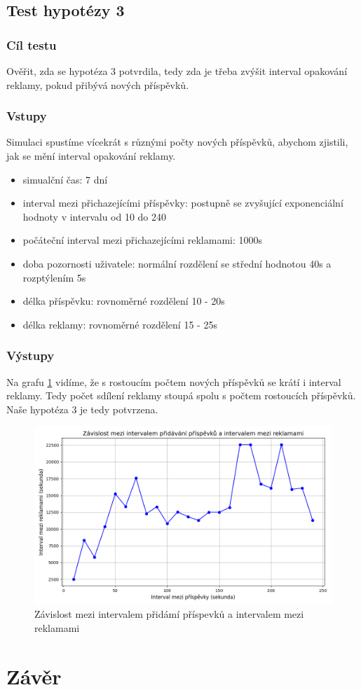 \documentclass[11pt, a4paper]{article}
\begin{document}
\subsection{Test hypotézy 3}
\subsubsection{Cíl testu}
Ověřit, zda se hypotéza 3 potvrdila, tedy zda je třeba zvýšit interval opakování reklamy, pokud přibývá nových příspěvků.
\subsubsection{Vstupy}
Simulaci spustíme vícekrát s různými počty nových příspěvků, abychom zjistili, jak se mění interval opakování reklamy.
\begin{itemize}
    \item simualční čas: 7 dní
    \item interval mezi přichazejícími příspěvky: postupně se zvyšující exponenciální hodnoty v intervalu od 10 do 240
    \item počáteční interval mezi přichazejícími reklamami: 1000s
    \item doba pozornosti uživatele: normální rozdělení se střední hodnotou 40s a rozptýlením 5s
    \item délka příspěvku: rovnoměrné rozdělení 10 - 20s
    \item délka reklamy: rovnoměrné rozdělení 15 - 25s

\end{itemize}
\subsubsection{Výstupy}
Na grafu \ref{fig:post_arrival_time_vs_ad_interval} vidíme, že s rostoucím počtem nových příspěvků se krátí i interval reklamy. Tedy počet sdílení reklamy stoupá spolu s počtem rostoucích příspěvků. Naše hypotéza 3 je tedy potvrzena.
\begin{figure}[h]
    \centering
    \includegraphics[width=\linewidth]{post_arrival_time_vs_ad_interval.png}
    \caption{Závislost mezi intervalem přidámí příspevků a intervalem mezi reklamami}
    \label{fig:post_arrival_time_vs_ad_interval}
\end{figure}

\section{Závěr}



    
\end{document}
